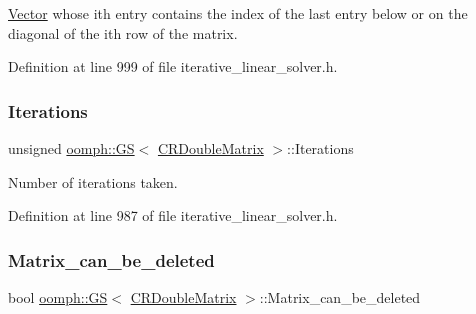 \hyperlink{classoomph_1_1Vector}{Vector} whose i\textquotesingle{}th entry contains the index of the last entry below or on the diagonal of the i\textquotesingle{}th row of the matrix. 



Definition at line 999 of file iterative\+\_\+linear\+\_\+solver.\+h.

\mbox{\label{classoomph_1_1GS_3_01CRDoubleMatrix_01_4_a1f8692d02e2ab2ae8be7faf90244c4ff}} 
\subsubsection{\texorpdfstring{Iterations}{Iterations}}
{\footnotesize\ttfamily unsigned \hyperlink{classoomph_1_1GS}{oomph\+::\+GS}$<$ \hyperlink{classoomph_1_1CRDoubleMatrix}{C\+R\+Double\+Matrix} $>$\+::Iterations\hspace{0.3cm}{\ttfamily [private]}}



Number of iterations taken. 



Definition at line 987 of file iterative\+\_\+linear\+\_\+solver.\+h.

\mbox{\label{classoomph_1_1GS_3_01CRDoubleMatrix_01_4_a832e1f37f8a3b83ed95bb5feea0ba92c}} 
\subsubsection{\texorpdfstring{Matrix\+\_\+can\+\_\+be\+\_\+deleted}{Matrix\_can\_be\_deleted}}
{\footnotesize\ttfamily bool \hyperlink{classoomph_1_1GS}{oomph\+::\+GS}$<$ \hyperlink{classoomph_1_1CRDoubleMatrix}{C\+R\+Double\+Matrix} $>$\+::Matrix\+\_\+can\+\_\+be\+\_\+deleted\hspace{0.3cm}{\ttfamily [private]}}



